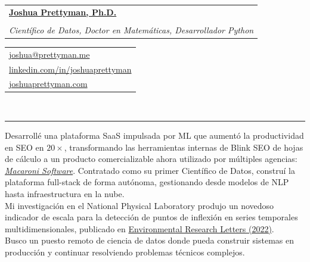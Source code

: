 \documentclass[10pt]{article}
\makeatletter
\newcommand{\makeheading}[8][]{
	\hspace*{-\marginparsep minus \marginparwidth}%
	\begin{minipage}[t]{\textwidth+\marginparwidth+\marginparsep}%
		\begin{tabular}[t]{@{}l}
		{\hspace{-8pt} \Large \bfseries#2}\\
		\\
		{\normalsize \emph{#3}}
		\end{tabular}
		\hfill
		\begin{tabular}[t]{|l}
		#4  \\
		#5  \\
		#6 \\

		\end{tabular}
		\vspace{1pt}
		\\[-0.2\baselineskip]%

		\rule{\columnwidth}{1pt}%
	\end{minipage}
}
\renewcommand{\section}[1]{
	\pagebreak[3]%
	\hyphenpenalty=10000%
	\vspace{\baselineskip}%
	\phantomsection\addcontentsline{toc}{section}{#1}%
	\noindent{\scshape #1}%
	\vspace{\baselineskip}\par
}
\newenvironment{innerlist}[1][\enskip\textbullet]{
	\begin{itemize}[#1,leftmargin=*,rightmargin=30pt,parsep=0pt,itemsep=1pt,topsep=2pt,partopsep=0pt]
}{\end{itemize}}
\providecommand*\url[1]{\href{#1}{#1}}
\renewcommand*\url[1]{\href{#1}{\texttt{#1}}}
\providecommand*\email[1]{\href{mailto:#1}{#1}}
\makeatother
\begin{document}
\makeheading{
		\href{https://joshuaprettyman.com/}{Joshua Prettyman, Ph.D.}
}
{Científico de Datos, Doctor en Matemáticas, Desarrollador Python}
{\email{joshua@prettyman.me}}
{\href{https://www.linkedin.com/in/joshuaprettyman/}{linkedin.com/in/joshuaprettyman}}
{\href{https://joshuaprettyman.com/}{joshuaprettyman.com}}







\section{Resumen Profesional}
Desarrollé una plataforma SaaS impulsada por ML que aumentó la productividad en SEO en $20\times$, transformando las herramientas internas de Blink SEO de hojas de cálculo a un producto comercializable ahora utilizado por múltiples agencias: \href{https://macalytics.app}{\textit{Macaroni Software}}. Contratado como su primer Científico de Datos, construí la plataforma full-stack de forma autónoma, gestionando desde modelos de NLP hasta infraestructura en la nube. \\
Mi investigación en el National Physical Laboratory produjo un novedoso indicador de escala para la detección de puntos de inflexión en series temporales multidimensionales, publicado en \href{https://doi.org/10.1088/1748-9326/ac526f}{Environmental Research Letters (2022)}.\\
Busco un puesto remoto de ciencia de datos donde pueda construir sistemas en producción y continuar resolviendo problemas técnicos complejos.


\end{document}
